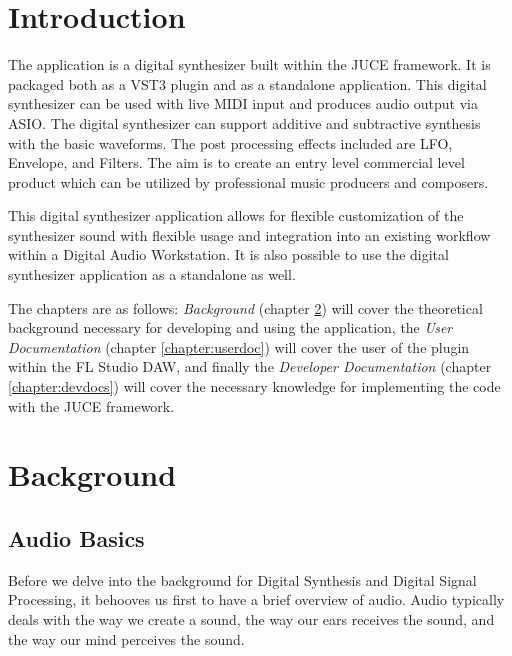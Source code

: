\documentclass[a4paper,12pt]{report}
\begin{document}



\vspace*{\fill}
\begin{center}

\end{center}
\vfill
\thispagestyle{empty}
\newpage
\setcounter{page}{1}

\tableofcontents

\chapter{Introduction}
\label{chapter:intro}

The application is a digital synthesizer built within the JUCE framework. It is packaged both as a VST3 plugin and as a standalone application. This digital synthesizer can be used with live MIDI input and produces audio output via ASIO. The digital synthesizer can support additive and subtractive synthesis with the basic waveforms. The post processing effects included are LFO, Envelope, and Filters. The aim is to create an entry level commercial level product which can be utilized by professional music producers and composers.

This digital synthesizer application allows for flexible customization of the synthesizer sound with flexible usage and integration into an existing workflow within a Digital Audio Workstation. It is also possible to use the digital synthesizer application as a standalone as well.

The chapters are as follows: \emph{Background} (chapter \ref{chapter:background}) will cover the theoretical background necessary for developing and using the application, the \emph{User Documentation} (chapter \ref{chapter:userdoc}) will cover the user of the plugin within the FL Studio DAW, and finally the \emph{Developer Documentation} (chapter \ref{chapter:devdocs}) will cover the necessary knowledge for implementing the code with the JUCE framework.


\chapter{Background}
\label{chapter:background}
\section{Audio Basics}
\label{sec:audiobasics}
Before we delve into the background for Digital Synthesis and Digital Signal Processing, it behooves us first to have a brief overview of audio. Audio typically deals with the way we create a sound, the way our ears receives the sound, and the way our mind perceives the sound.
\end{document}
